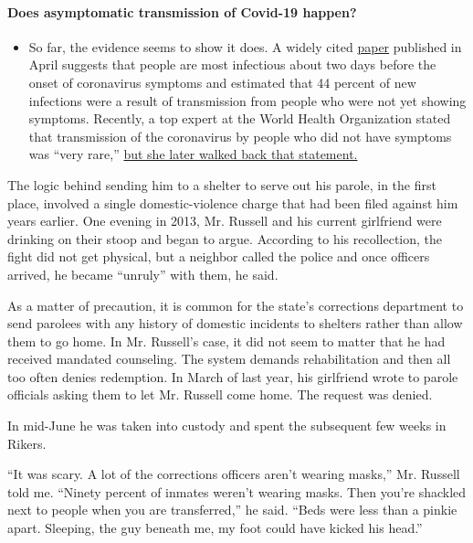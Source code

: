 \begin{itemize}
{  \paragraph{Does asymptomatic transmission of Covid-19
  happen?}\label{does-asymptomatic-transmission-of-covid-19-happen}}

  \begin{itemize}
  \tightlist
  \item
    So far, the evidence seems to show it does. A widely cited
    \href{https://www.nature.com/articles/s41591-020-0869-5}{paper}
    published in April suggests that people are most infectious about
    two days before the onset of coronavirus symptoms and estimated that
    44 percent of new infections were a result of transmission from
    people who were not yet showing symptoms. Recently, a top expert at
    the World Health Organization stated that transmission of the
    coronavirus by people who did not have symptoms was ``very rare,''
    \href{https://www.nytimes3xbfgragh.onion/2020/06/09/world/coronavirus-updates.html?action=click\&pgtype=Article\&state=default\&region=MAIN_CONTENT_3\&context=storylines_faq\#link-1f302e21}{but
    she later walked back that statement.}
  \end{itemize}
\end{itemize}

The logic behind sending him to a shelter to serve out his parole, in
the first place, involved a single domestic-violence charge that had
been filed against him years earlier. One evening in 2013, Mr. Russell
and his current girlfriend were drinking on their stoop and began to
argue. According to his recollection, the fight did not get physical,
but a neighbor called the police and once officers arrived, he became
``unruly'' with them, he said.

As a matter of precaution, it is common for the state's corrections
department to send parolees with any history of domestic incidents to
shelters rather than allow them to go home. In Mr. Russell's case, it
did not seem to matter that he had received mandated counseling. The
system demands rehabilitation and then all too often denies redemption.
In March of last year, his girlfriend wrote to parole officials asking
them to let Mr. Russell come home. The request was denied.

In mid-June he was taken into custody and spent the subsequent few weeks
in Rikers.

``It was scary. A lot of the corrections officers aren't wearing
masks,'' Mr. Russell told me. ``Ninety percent of inmates weren't
wearing masks. Then you're shackled next to people when you are
transferred,'' he said. ``Beds were less than a pinkie apart. Sleeping,
the guy beneath me, my foot could have kicked his head.''

